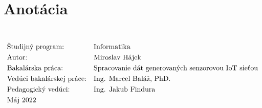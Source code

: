 \thispagestyle{empty}
\section*{Anotácia}
\University \\
\uppercase{\Faculty}
\vspace{-8pt}
{\setlength{\mathindent}{0cm}
\begin{align*}
&\text{Študijný program:} && \text{\StudyProgramme} \\
&\text{Autor:} && \text{\Author} \\
&\text{\Thesis:} && \text{\Title} \\
&\text{Vedúci bakalárskej práce:} && \text{\Supervisor} \\
&\text{Pedagogický vedúci:} && \text{\PedagogicalSupervisor} \\
&\text{\Date}
\end{align*}}
%

\emptypage

\thispagestyle{empty}
